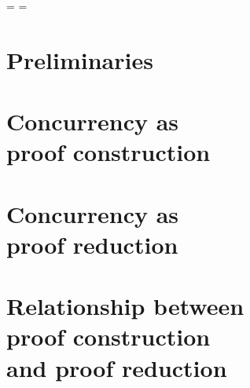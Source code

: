 \documentclass[
  tufte-book,
  notoc,
  biblatex={
    citestyle=authoryear-comp,
    autocite=footnote,
    maxcitenames=2,
    bibstyle=authoryear,
    dashed=false,
    mergedate=basic,
    maxbibnames=99,
    backref=true,
    doi=false,
    url=false,
    isbn=false,
  }
]{tufte-thesis}
\begin{document}
\oddsidemargin=\saveoddsidemargin
\evensidemargin=\saveevensidemargin

\tableofcontents

\mainmatter




\part{Preliminaries}\label{part:preliminaries}




 \part[Concurrency as proof construction]{Concurrency as\\proof construction}\label{part:proof-construction}



% 

% 


\part[Concurrency as proof reduction]{Concurrency as\\proof reduction}\label{part:proof-reduction}




\part[Relationship between proof construction and reduction]{Relationship between\\proof construction\\and proof reduction}\label{part:comparison}




\appendix



\backmatter

\printbibliography
\end{document}
